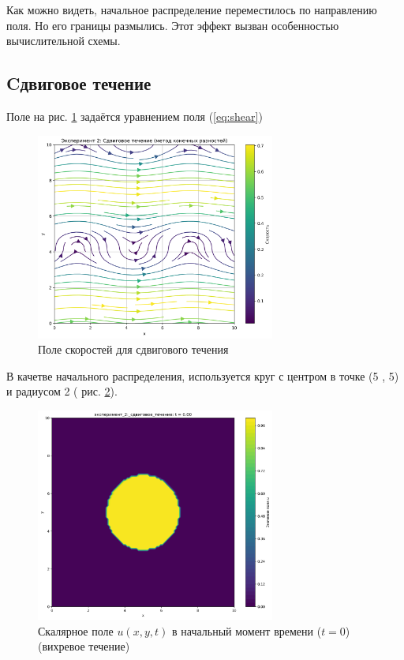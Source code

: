 Как можно видеть, начальное распределение переместилось по направлению поля. Но его границы размылись. Этот эффект вызван особенностью вычислительной схемы.
\newpage
\subsection{Cдвиговое течение}
Поле на рис. \ref{fig:shear_velocity} задаётся уравнением поля (\ref{eq:shear})
\begin{figure}
	\centering
	\includegraphics[width=0.7\textwidth]{imgs/эксперимент_2:_сдвиговое_течение_fd_velocity_field.png}
	\caption{Поле скоростей для сдвигового течения}
	\label{fig:shear_velocity}
\end{figure}

В качетве начального распределения, используется круг с центром в точке (5 , 5) и радиусом 2 ( рис. \ref{fig:shear_begin}).
\begin{figure}
	\centering
	\includegraphics[width=0.7\textwidth]{imgs/эксперимент_2:_сдвиговое_течение_t0.00.png}
	\caption{Скалярное поле \(u(x,y,t)\) в начальный момент времени ($t=0$) (вихревое течение)}
	\label{fig:shear_begin}
\end{figure}

